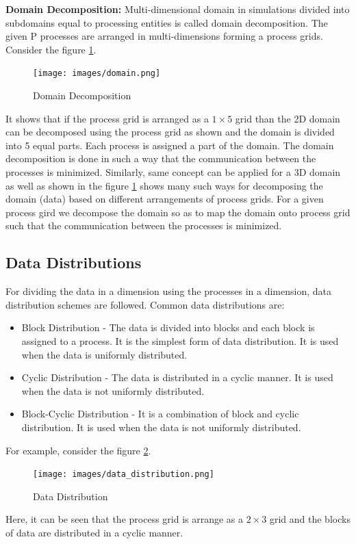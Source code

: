 \documentclass[12pt]{book}
\begin{document}
\textbf{Domain Decomposition: }Multi-dimensional domain in simulations divided into subdomains equal to processing entities is called domain decomposition.
The given P processes are arranged in multi-dimensions forming a process grids. Consider the figure \ref{fig:domain}.
\begin{figure}[H]
    \centering
    \texttt{[image: images/domain.png]}
    \caption{Domain Decomposition}
    \label{fig:domain}
\end{figure}
It shows that if the process grid is arranged as a $1 \times 5$ grid than the 2D domain can be decomposed using the process grid as shown 
and the domain is divided into 5 equal parts. Each process is assigned a part of the domain. The domain decomposition is done in such a way that the communication between the processes is minimized.
Similarly, same concept can be applied for a 3D domain as well as shown in the figure \ref{fig:domain} shows many such ways for decomposing the domain (data) based on different arrangements of process grids.
For a given process gird we decompose the domain so as to map the domain onto process grid such that the communication between the processes is minimized.

\subsection{Data Distributions}
For dividing the data in a dimension using the processes in a dimension, data distribution schemes are followed. 
Common data distributions are:
\begin{itemize}
    \item Block Distribution - The data is divided into blocks and each block is assigned to a process. It is the simplest form of data distribution. It is used when the data is uniformly distributed.
    \item Cyclic Distribution - The data is distributed in a cyclic manner. It is used when the data is not uniformly distributed.
    \item Block-Cyclic Distribution - It is a combination of block and cyclic distribution. It is used when the data is not uniformly distributed.
\end{itemize}
For example, consider the figure \ref{fig:data_distribution}. 
\begin{figure}[H]
    \centering
    \texttt{[image: images/data\_distribution.png]}
    \caption{Data Distribution}
    \label{fig:data_distribution}
\end{figure}
Here, it can be seen that the process grid is arrange as a $2 \times 3$ grid and the blocks of data are distributed in a cyclic manner.
\end{document}
